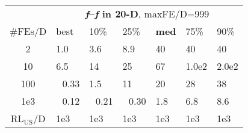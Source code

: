 \begin{tabular}{c|llllll}
 & \multicolumn{6}{|c}{\textbf{\textit{f}\raisebox{-0.35ex}{1}--\textit{f}\raisebox{-0.35ex}{55} in 20-D}, maxFE/D=999}\\
\#FEs/D & best & 10\% & 25\% & \textbf{med} & 75\% & 90\%\\
2 & \hspace*{1ex}1.0 & \hspace*{1ex}3.6 & \hspace*{1ex}8.9 & 40 & 40 & 40\\
10 & \hspace*{1ex}6.5 & 14 & 25 & 67 & 1.0e2 & 2.0e2\\
100 & ~\,0.33 & \hspace*{1ex}1.5 & 11 & 20 & 28 & 38\\
1e3 & ~\,0.12 & ~\,0.21 & ~\,0.30 & \hspace*{1ex}1.8 & \hspace*{1ex}6.8 & \hspace*{1ex}8.6\\
$\text{RL}_{\text{US}}$/D & 1e3 & 1e3 & 1e3 & 1e3 & 1e3 & 1e3
\end{tabular}
